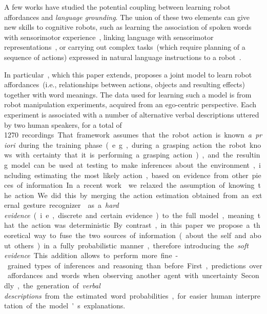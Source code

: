 
A few works have studied the potential coupling between learning robot affordances and \emph{language grounding}.
The union of these two elements can give new skills to cognitive robots, such as learning the association of spoken words with sensorimotor experience~\cite{salvi:2012:smcb,morse:2016:cogsci}, linking language with sensorimotor representations~\cite{stramandinoli:2016:icdl}, or carrying out complex %
tasks~(which require planning of a sequence of actions) expressed in natural language instructions to a robot~\cite{antunes:2016:icra}.

In particular~\cite{salvi:2012:smcb}, which this paper extends, proposes a joint model to learn robot affordances~(i.e., relationships between actions, objects and resulting effects) together with word meanings.
The data used for learning such a model is from robot manipulation experiments, acquired from an ego-centric perspective.
Each experiment is associated with a number of alternative verbal descriptions uttered by two human speakers, for a total of \SI{1270}~recordings.
That framework assumes that the robot action is known \emph{a~priori} during the training phase~(e.g., during a grasping action the robot knows with certainty that it is performing a grasping action), and the resulting model can be used at testing to make inferences about the environment, including estimating the most likely action, based on evidence from other pieces of information.
In a recent work~\cite{saponaro:2017:glu} we relaxed the assumption of knowing the action.
We did this by merging the action estimation obtained from an external gesture recognizer~\cite{saponaro:2013:crhri} as a \emph{hard evidence}~(i.e., discrete and certain evidence) to the full model, meaning that the action was deterministic.
By contrast, in this paper we propose a theoretical way to fuse the two sources of information~(about the self and about others) in a fully probabilistic manner, therefore introducing the \emph{soft evidence}.
This addition allows to perform more fine-grained types of inferences and reasoning than before.
First, predictions over affordances and words when observing another agent with uncertainty.
Secondly, the generation of \emph{verbal descriptions} from the estimated word probabilities, for easier human interpretation of the model's explanations.

